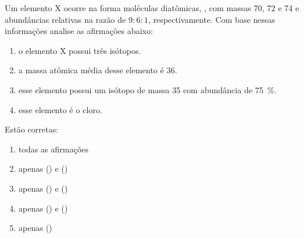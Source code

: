 Um elemento X ocorre na forma moléculas diatômicas,  , com massas 70, 72 e 74 e abundâncias relativas na razão de $9 : 6 : 1$, respectivamente.
Com base nessas informações analise as afirmações abaixo:

\begin{enumerate}[label = (\scaleroman{\roman*})]
\item o elemento X possui três isótopos.
\item a massa atômica média desse elemento é 36.
\item esse elemento possui um isótopo de massa 35 com abundância de \SI{75}{\percent}.
\item esse elemento é o cloro.
\end{enumerate}

Estão corretas:

\begin{enumerate}[label = (\scalealph{\alph*})]
	\item todas as afirmações
	\item apenas () e ()
	\item apenas () e ()
	\item apenas () e ()
	\item apenas ()
\end{enumerate}
